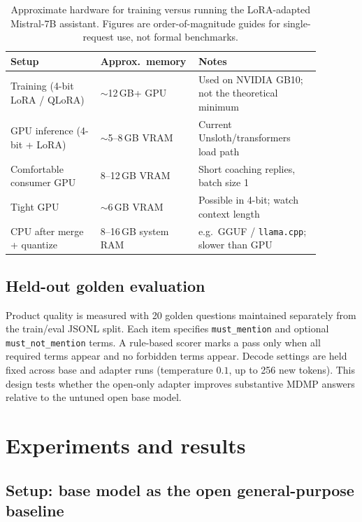 \documentclass[11pt]{article}
\begin{document}
\begin{table}[H]
  \centering
  \caption{Approximate hardware for training versus running the LoRA-adapted
  Mistral-7B assistant. Figures are order-of-magnitude guides for single-request
  use, not formal benchmarks.}
  \label{tab:hardware}
  \begin{tabular}{p{0.28\linewidth}p{0.22\linewidth}p{0.38\linewidth}}
    \toprule
    Setup & Approx.\ memory & Notes \\
    \midrule
    Training (4-bit LoRA / QLoRA) & ${\sim}$12\,GB+ GPU &
      Used on NVIDIA GB10; not the theoretical minimum \\
    GPU inference (4-bit + LoRA) & ${\sim}$5--8\,GB VRAM &
      Current Unsloth/transformers load path \\
    Comfortable consumer GPU & 8--12\,GB VRAM &
      Short coaching replies, batch size 1 \\
    Tight GPU & ${\sim}$6\,GB VRAM &
      Possible in 4-bit; watch context length \\
    CPU after merge + quantize & 8--16\,GB system RAM &
      e.g.\ GGUF / \texttt{llama.cpp}; slower than GPU \\
    \bottomrule
  \end{tabular}
\end{table}

\subsection{Held-out golden evaluation}
\label{sec:method-eval}

Product quality is measured with 20 golden questions maintained separately from
the train/eval JSONL split.
Each item specifies \texttt{must\_mention} and optional
\texttt{must\_not\_mention} terms.
A rule-based scorer marks a pass only when all required terms appear and no
forbidden terms appear.
Decode settings are held fixed across base and adapter runs
(temperature $0.1$, up to 256 new tokens).
This design tests whether the open-only adapter improves substantive MDMP
answers relative to the untuned open base model.

\section{Experiments and results}
\label{sec:results}

\subsection{Setup: base model as the open general-purpose baseline}
\label{sec:results-setup}
\end{document}
